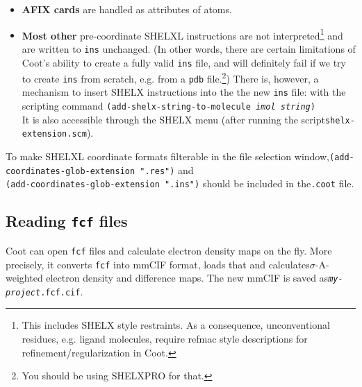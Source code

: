 \documentclass{article}
\begin{document}
\begin{itemize}
\item {\bf AFIX cards} are handled as attributes of atoms.

\item {\bf Most other} pre-coordinate SHELXL instructions are not
  interpreted\footnote{This includes SHELX style restraints. As a
    consequence, unconventional residues, e.g. ligand molecules,
    require refmac style descriptions for refinement/regularization in
    Coot.} and are written to \texttt{ins} unchanged. (In other words,
  there are certain limitations of Coot's ability to create a fully
  valid \texttt{ins} file, and will definitely fail if we try to
  create \texttt{ins} from scratch, e.g. from a \texttt{pdb}
  file.\footnote{You should be using SHELXPRO for that.}) There is,
  however, a mechanism to insert SHELX instructions into the the new
  \texttt{ins} file: with the scripting command
  \texttt{(add-shelx-string-to-molecule \emph{imol string})}\\It is
  also accessible through the SHELX menu (after running the
  script\linebreak[4]\texttt{shelx-extension.scm}).


\end{itemize}

To make SHELXL coordinate formats filterable in the file selection
window,\linebreak[4]\texttt{(add-coordinates-glob-extension ".res")}
and \\\texttt{(add-coordinates-glob-extension ".ins")} should be
included in the\linebreak[4]\texttt{.coot} file.

\subsection{Reading \texttt{fcf} files}

Coot can open \texttt{fcf} files and calculate electron density maps
on the fly. More precisely, it converts \texttt{fcf} into mmCIF
format, loads that and calculates\linebreak[4]$\sigma$-A-weighted
electron density and difference maps. The new mmCIF is saved
as\linebreak[4]\texttt{\emph{my-project}.fcf.cif}.
\end{document}
